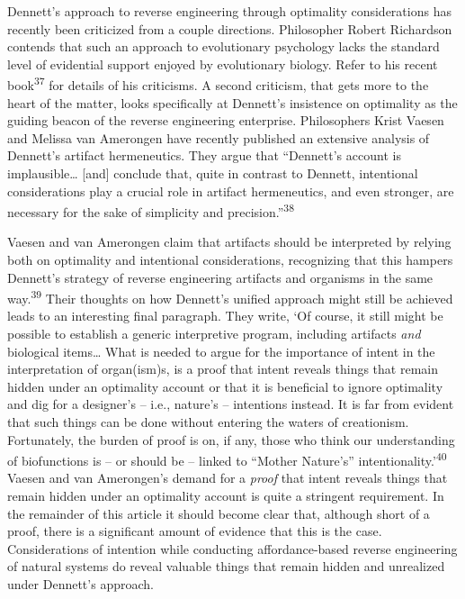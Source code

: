 Dennett’s approach to reverse engineering through optimality
considerations has recently been criticized from a couple directions.
Philosopher Robert Richardson contends that such an approach to
evolutionary psychology lacks the standard level of evidential support
enjoyed by evolutionary biology. Refer to his recent
book\textsuperscript{37} for details of his criticisms. A second
criticism, that gets more to the heart of the matter, looks
specifically at Dennett’s insistence on optimality as the guiding
beacon of the reverse engineering enterprise. Philosophers Krist Vaesen
and Melissa van Amerongen have recently published an extensive analysis
of Dennett’s artifact hermeneutics. They argue that “Dennett’s account
is implausible… [and] conclude that, quite in contrast to Dennett,
intentional considerations play a crucial role in artifact
hermeneutics, and even stronger, are necessary for the sake of
simplicity and precision.”\textsuperscript{38}


Vaesen and van Amerongen claim that artifacts should be interpreted by
relying both on optimality and intentional considerations, recognizing
that this hampers Dennett’s strategy of reverse engineering artifacts
and organisms in the same way.\textsuperscript{39} Their thoughts on
how Dennett’s unified approach might still be achieved leads to an
interesting final paragraph. They write, ‘Of course, it still might be
possible to establish a generic interpretive program, including
artifacts \textit{and} biological items… What is needed to argue for
the importance of intent in the interpretation of organ(ism)s, is a
proof that intent reveals things that remain hidden under an optimality
account or that it is beneficial to ignore optimality and dig for a
designer’s – i.e., nature’s – intentions instead. It is far from
evident that such things can be done without entering the waters of
creationism. Fortunately, the burden of proof is on, if any, those who
think our understanding of biofunctions is – or should be – linked to
“Mother Nature’s” intentionality.’\textsuperscript{40} Vaesen and van
Amerongen’s demand for a \textit{proof} that intent reveals things that
remain hidden under an optimality account is quite a stringent
requirement. In the remainder of this article it should become clear
that, although short of a proof, there is a significant amount of
evidence that this is the case. Considerations of intention while
conducting affordance-based reverse engineering of natural systems do
reveal valuable things that remain hidden and unrealized under
Dennett’s approach.

